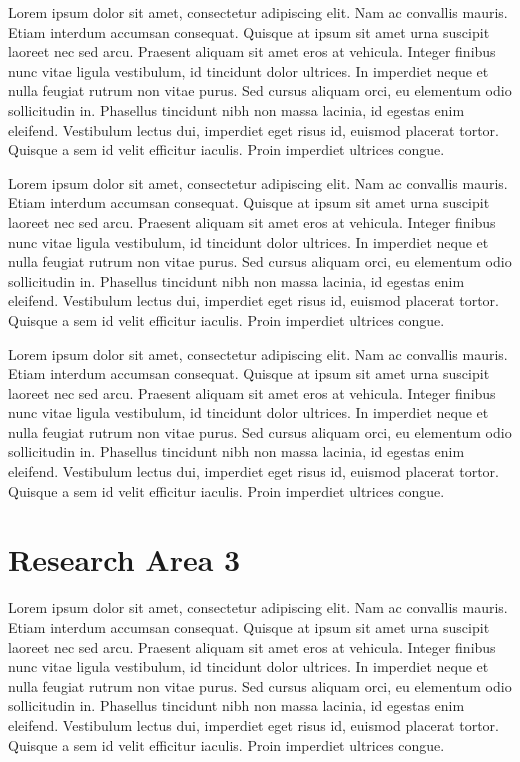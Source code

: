 \documentclass[oneside]{memoir}
\begin{document}
Lorem ipsum dolor sit amet, consectetur adipiscing elit. Nam ac convallis mauris. Etiam interdum accumsan consequat. Quisque at ipsum sit amet urna suscipit laoreet nec sed arcu. Praesent aliquam sit amet eros at vehicula. Integer finibus nunc vitae ligula vestibulum, id tincidunt dolor ultrices. In imperdiet neque et nulla feugiat rutrum non vitae purus. Sed cursus aliquam orci, eu elementum odio sollicitudin in. Phasellus tincidunt nibh non massa lacinia, id egestas enim eleifend. Vestibulum lectus dui, imperdiet eget risus id, euismod placerat tortor. Quisque a sem id velit efficitur iaculis. Proin imperdiet ultrices congue.

Lorem ipsum dolor sit amet, consectetur adipiscing elit. Nam ac convallis mauris. Etiam interdum accumsan consequat. Quisque at ipsum sit amet urna suscipit laoreet nec sed arcu. Praesent aliquam sit amet eros at vehicula. Integer finibus nunc vitae ligula vestibulum, id tincidunt dolor ultrices. In imperdiet neque et nulla feugiat rutrum non vitae purus. Sed cursus aliquam orci, eu elementum odio sollicitudin in. Phasellus tincidunt nibh non massa lacinia, id egestas enim eleifend. Vestibulum lectus dui, imperdiet eget risus id, euismod placerat tortor. Quisque a sem id velit efficitur iaculis. Proin imperdiet ultrices congue.

Lorem ipsum dolor sit amet, consectetur adipiscing elit. Nam ac convallis mauris. Etiam interdum accumsan consequat. Quisque at ipsum sit amet urna suscipit laoreet nec sed arcu. Praesent aliquam sit amet eros at vehicula. Integer finibus nunc vitae ligula vestibulum, id tincidunt dolor ultrices. In imperdiet neque et nulla feugiat rutrum non vitae purus. Sed cursus aliquam orci, eu elementum odio sollicitudin in. Phasellus tincidunt nibh non massa lacinia, id egestas enim eleifend. Vestibulum lectus dui, imperdiet eget risus id, euismod placerat tortor. Quisque a sem id velit efficitur iaculis. Proin imperdiet ultrices congue.

%
%

\chapter{Research Area 3}
\label{ch:credibility}

Lorem ipsum dolor sit amet, consectetur adipiscing elit. Nam ac convallis mauris. Etiam interdum accumsan consequat. Quisque at ipsum sit amet urna suscipit laoreet nec sed arcu. Praesent aliquam sit amet eros at vehicula. Integer finibus nunc vitae ligula vestibulum, id tincidunt dolor ultrices. In imperdiet neque et nulla feugiat rutrum non vitae purus. Sed cursus aliquam orci, eu elementum odio sollicitudin in. Phasellus tincidunt nibh non massa lacinia, id egestas enim eleifend. Vestibulum lectus dui, imperdiet eget risus id, euismod placerat tortor. Quisque a sem id velit efficitur iaculis. Proin imperdiet ultrices congue.
\end{document}

